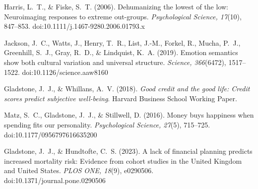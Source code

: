 \documentclass[
]{article}
\begin{document}
Harris, L.~T., \& Fiske, S.~T. (2006). Dehumanizing the lowest of the
low: Neuroimaging responses to extreme out-groups. \emph{Psychological
Science, 17}(10), 847--853. doi:10.1111/j.1467-9280.2006.01793.x

Jackson, J.~C., Watts, J., Henry, T.~R., List, J.-M., Forkel, R., Mucha,
P.~J., Greenhill, S.~J., Gray, R.~D., \& Lindquist, K.~A. (2019).
Emotion semantics show both cultural variation and universal structure.
\emph{Science, 366}(6472), 1517--1522. doi:10.1126/science.aaw8160

Gladstone, J.~J., \& Whillans, A.~V. (2018). \emph{Good credit and the
good life: Credit scores predict subjective well-being}. Harvard
Business School Working Paper.

Matz, S.~C., Gladstone, J.~J., \& Stillwell, D. (2016). Money buys
happiness when spending fits our personality. \emph{Psychological
Science, 27}(5), 715--725. doi:10.1177/0956797616635200

Gladstone, J.~J., \& Hundtofte, C.~S. (2023). A lack of financial
planning predicts increased mortality risk: Evidence from cohort studies
in the United Kingdom and United States. \emph{PLOS ONE, 18}(9),
e0290506. doi:10.1371/journal.pone.0290506
\end{document}

